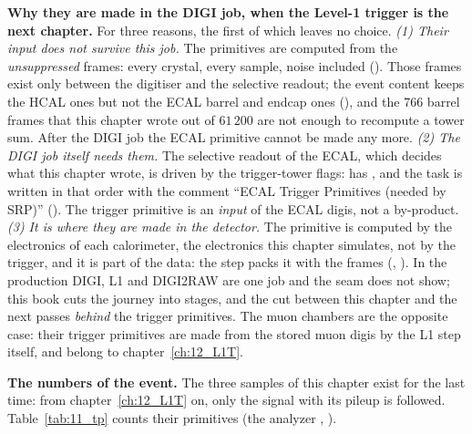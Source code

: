 \textbf{Why they are made in the DIGI job, when the Level-1 trigger is the next chapter.} For three reasons, the
first of which leaves no choice.
\emph{(1) Their input does not survive this job.} The primitives are computed from the \emph{unsuppressed} frames:
every crystal, every sample, noise included (). Those frames exist only
between the digitiser and the selective readout; the event content keeps the HCAL ones but not the ECAL barrel and
endcap ones (), and the 766 barrel
frames that this chapter wrote out of $61\,200$ are not enough to recompute a tower sum. After the DIGI job the
ECAL primitive cannot be made any more.
\emph{(2) The DIGI job itself needs them.} The selective readout of the ECAL, which decides what
this chapter wrote, is driven by the trigger-tower flags:  has
, and the task is written in that order with the comment
``ECAL Trigger Primitives (needed by SRP)'' (). The
trigger primitive is an \emph{input} of the ECAL digis, not a by-product.
\emph{(3) It is where they are made in the detector.} The primitive is computed by the electronics of each
calorimeter, the electronics this chapter simulates, not by the trigger, and it is part of the data: the
 step packs it with the frames (,
). In the production DIGI, L1 and DIGI2RAW are one job and the seam does not show; this book cuts
the journey into stages, and the cut between this chapter and the next passes \emph{behind} the trigger primitives. The muon chambers are the opposite case:
their trigger primitives are made from the stored muon digis by the L1 step itself, and belong to
chapter~\ref{ch:12_L1T}.

\textbf{The numbers of the event.} The three samples of this chapter exist for the last time: from
chapter~\ref{ch:12_L1T} on, only the signal with its pileup is followed. Table~\ref{tab:11_tp} counts their
primitives (the analyzer , ).

